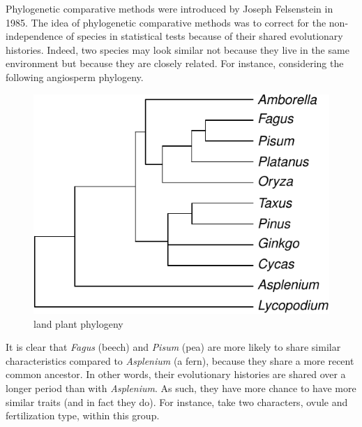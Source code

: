 \documentclass[
]{book}
\begin{document}
Phylogenetic comparative methods were introduced by Joseph Felsenstein in 1985. The idea of phylogenetic comparative methods was to correct for the non-independence of species in statistical tests because of their shared evolutionary histories. Indeed, two species may look similar not because they live in the same environment but because they are closely related. For instance, considering the following angiosperm phylogeny.

\begin{figure}

{\centering \includegraphics{bookdown-demo_files/figure-latex/AngiospermTree-1} 

}

\caption{land plant phylogeny}\label{fig:AngiospermTree}
\end{figure}

It is clear that \emph{Fagus} (beech) and \emph{Pisum} (pea) are more likely to share similar characteristics compared to \emph{Asplenium} (a fern), because they share a more recent common ancestor. In other words, their evolutionary histories are shared over a longer period than with \emph{Asplenium}. As such, they have more chance to have more similar traits (and in fact they do). For instance, take two characters, ovule and fertilization type, within this group.
\end{document}
